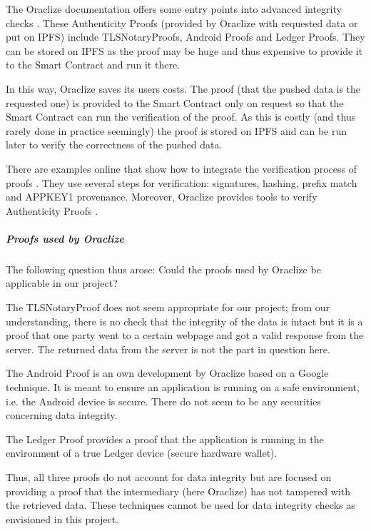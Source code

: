 The Oraclize documentation offers some entry points into advanced integrity checks \cite{relatedWork04}. These Authenticity Proofs (provided by Oraclize with requested data or put on IPFS) \cite{relatedWork05} include TLSNotaryProofs, Android Proofs and Ledger Proofs. They can be stored on IPFS as the proof may be huge and thus expensive to provide it to the Smart Contract and run it there. \cite{relatedWork06}

In this way, Oraclize saves its users costs. The proof (that the pushed data is the requested one) is provided to the Smart Contract only on request so that the Smart Contract can run the verification of the proof. As this is costly (and thus rarely done in practice seemingly) the proof is stored on IPFS and can be run later to verify the correctness of the pushed data.

There are examples online that show how to integrate the verification process of proofs \cite{relatedWork07}. They use several steps for verification: signatures, hashing, prefix match and APPKEY1 provenance. Moreover, Oraclize provides tools to verify Authenticity Proofs \cite{relatedWork08, relatedWork09}.

\subparagraph{Proofs used by Oraclize}
The following question thus arose: Could the proofs used by Oraclize be applicable in our project?

The TLSNotaryProof \cite{relatedWork10, relatedWork11, relatedWork12} does not seem appropriate for our project; from our understanding, there is no check that the integrity of the data is intact but it is a proof that one party went to a certain webpage and got a valid response from the server. The returned data from the server is not the part in question here.

The Android Proof \cite{relatedWork13} is an own development by Oraclize based on a Google technique. It is meant to ensure an application is running on a safe environment, i.e. the Android device is secure. There do not seem to be any securities concerning data integrity.

The Ledger Proof \cite{relatedWork14, relatedWork15} provides a proof that the application is running in the environment of a true Ledger device (secure hardware wallet).

Thus, all three proofs do not account for data integrity but are focused on providing a proof that the intermediary (here Oraclize) has not tampered with the retrieved data. These techniques cannot be used for data integrity checks as envisioned in this project.

